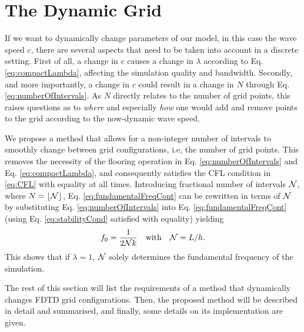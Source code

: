 \section{The Dynamic Grid}
If we want to dynamically change parameters of our model, in this case the wave speed $c$, there are several aspects that need to be taken into account in a discrete setting. First of all, a change in $c$ causes a change in $\lambda$ according to Eq. \eqref{eq:compactLambda}, affecting the simulation quality and bandwidth. Secondly, and more importantly, a change in $c$ could result in a change in $N$ through Eq. \eqref{eq:numberOfIntervals}. As $N$ directly relates to the number of grid points, this raises questions as to \textit{where} and especially \textit{how} one would add and remove points to the grid according to the now-dynamic wave speed.

We propose a method that allows for a non-integer number of intervals to smoothly change between grid configurations, i.e, the number of grid points. This removes the necessity of the flooring operation in Eq. \eqref{eq:numberOfIntervals} and Eq. \eqref{eq:compactLambda}, and consequently satisfies the CFL condition in \eqref{eq:CFL} with equality at all times. Introducing fractional number of intervals $\mathcal{N}$, where $N = \lfloor \mathcal{N}\rfloor$, Eq. \eqref{eq:fundamentalFreqCont} can be rewritten in terms of $\mathcal{N}$ by substituting Eq. \eqref{eq:numberOfIntervals} into Eq. \eqref{eq:fundamentalFreqCont} (using Eq. \eqref{eq:stabilityCond} satisfied with equality) yielding
\begin{equation}\label{eq:fundamentalFreq}
    f_0 = \frac{1}{2\mathcal{N} k}\quad \text{with}\quad \mathcal{N} = L/h.
\end{equation}
This shows that if $\lambda = 1$, $\mathcal{N}$ solely determines the fundamental frequency of the simulation. 


The rest of this section will list the requirements of a method that dynamically changes FDTD grid configurations. %
Then, the proposed method will be described in detail and summarised, and finally, some details on its implementation are given. 

